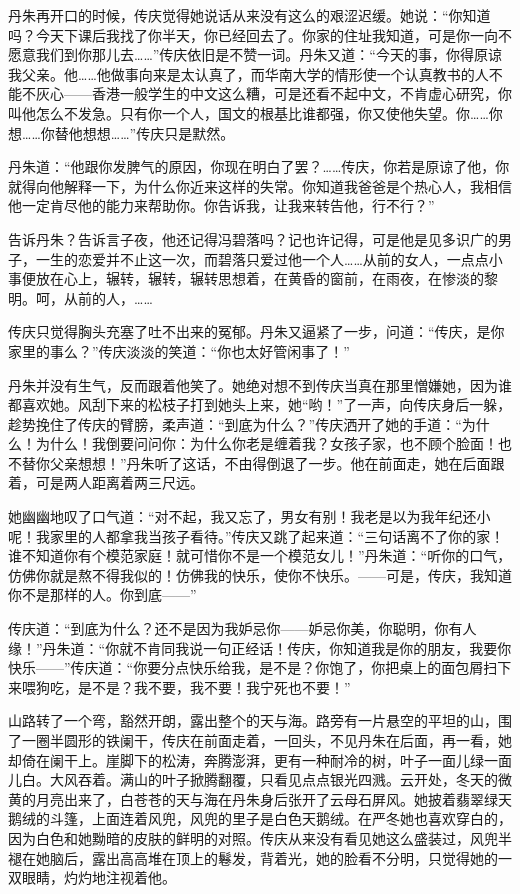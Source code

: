 \par 丹朱再开口的时候，传庆觉得她说话从来没有这么的艰涩迟缓。她说：“你知道吗？今天下课后我找了你半天，你已经回去了。你家的住址我知道，可是你一向不愿意我们到你那儿去……”传庆依旧是不赞一词。丹朱又道：“今天的事，你得原谅我父亲。他……他做事向来是太认真了，而华南大学的情形使一个认真教书的人不能不灰心——香港一般学生的中文这么糟，可是还看不起中文，不肯虚心研究，你叫他怎么不发急。只有你一个人，国文的根基比谁都强，你又使他失望。你……你想……你替他想想……”传庆只是默然。
\par 丹朱道：“他跟你发脾气的原因，你现在明白了罢？……传庆，你若是原谅了他，你就得向他解释一下，为什么你近来这样的失常。你知道我爸爸是个热心人，我相信他一定肯尽他的能力来帮助你。你告诉我，让我来转告他，行不行？”
\par 告诉丹朱？告诉言子夜，他还记得冯碧落吗？记也许记得，可是他是见多识广的男子，一生的恋爱并不止这一次，而碧落只爱过他一个人……从前的女人，一点点小事便放在心上，辗转，辗转，辗转思想着，在黄昏的窗前，在雨夜，在惨淡的黎明。呵，从前的人，……
\par 传庆只觉得胸头充塞了吐不出来的冤郁。丹朱又逼紧了一步，问道：“传庆，是你家里的事么？”传庆淡淡的笑道：“你也太好管闲事了！”
\par 丹朱并没有生气，反而跟着他笑了。她绝对想不到传庆当真在那里憎嫌她，因为谁都喜欢她。风刮下来的松枝子打到她头上来，她“哟！”了一声，向传庆身后一躲，趁势挽住了传庆的臂膀，柔声道：“到底为什么？”传庆洒开了她的手道：“为什么！为什么！我倒要问问你：为什么你老是缠着我？女孩子家，也不顾个脸面！也不替你父亲想想！”丹朱听了这话，不由得倒退了一步。他在前面走，她在后面跟着，可是两人距离着两三尺远。
\par 她幽幽地叹了口气道：“对不起，我又忘了，男女有别！我老是以为我年纪还小呢！我家里的人都拿我当孩子看待。”传庆又跳了起来道：“三句话离不了你的家！谁不知道你有个模范家庭！就可惜你不是一个模范女儿！”丹朱道：“听你的口气，仿佛你就是熬不得我似的！仿佛我的快乐，使你不快乐。——可是，传庆，我知道你不是那样的人。你到底——”
\par 传庆道：“到底为什么？还不是因为我妒忌你——妒忌你美，你聪明，你有人缘！”丹朱道：“你就不肯同我说一句正经话！传庆，你知道我是你的朋友，我要你快乐——”传庆道：“你要分点快乐给我，是不是？你饱了，你把桌上的面包屑扫下来喂狗吃，是不是？我不要，我不要！我宁死也不要！”
\par 山路转了一个弯，豁然开朗，露出整个的天与海。路旁有一片悬空的平坦的山，围了一圈半圆形的铁阑干，传庆在前面走着，一回头，不见丹朱在后面，再一看，她却倚在阑干上。崖脚下的松涛，奔腾澎湃，更有一种耐冷的树，叶子一面儿绿一面儿白。大风吞着。满山的叶子掀腾翻覆，只看见点点银光四溅。云开处，冬天的微黄的月亮出来了，白苍苍的天与海在丹朱身后张开了云母石屏风。她披着翡翠绿天鹅绒的斗篷，上面连着风兜，风兜的里子是白色天鹅绒。在严冬她也喜欢穿白的，因为白色和她黝暗的皮肤的鲜明的对照。传庆从来没有看见她这么盛装过，风兜半褪在她脑后，露出高高堆在顶上的鬈发，背着光，她的脸看不分明，只觉得她的一双眼睛，灼灼地注视着他。
